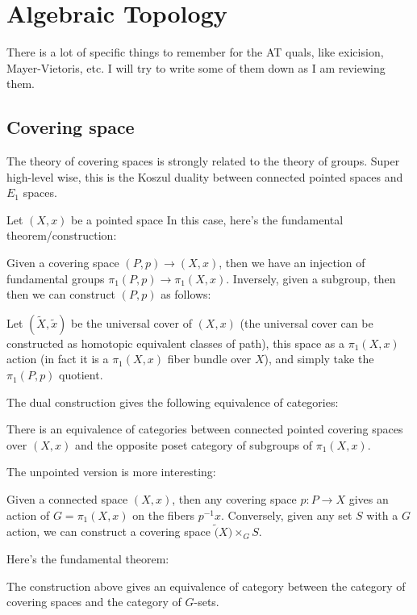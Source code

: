 \documentclass[main.tex]{subfiles}
\begin{document}
\section{Algebraic Topology}
There is a lot of specific things to remember for the AT quals, like exicision, Mayer-Vietoris, etc. I will try to write some of them down as I am reviewing them.

\subsection{Covering space}
The theory of covering spaces is strongly related to the theory of groups. Super high-level wise, this is the Koszul duality between connected pointed spaces and $E_1$ spaces.

Let $(X,x)$ be a pointed space
In this case, here's the fundamental theorem/construction:

\begin{construction}
Given a covering space $(P, p) \rightarrow (X,x)$, then we have an injection of fundamental groups $\pi_1 (P, p) \rightarrow \pi_1 (X,x)$. Inversely, given a subgroup, then then we can construct $(P, p)$ as follows:

Let $(\tilde{X}, \tilde{x})$ be the universal cover of $(X,x)$ (the universal cover can be constructed as homotopic equivalent classes of path), this space as a $\pi_1(X,x)$ action (in fact it is a $\pi_1(X,x)$ fiber bundle over $X$), and simply take the $\pi_1(P, p)$ quotient.
\end{construction}

The dual construction gives the following equivalence of categories:
\begin{theorem}
There is an equivalence of categories between connected pointed covering spaces over $(X, x)$ and the opposite poset category of subgroups of $\pi_1(X,x)$.
\end{theorem}

The unpointed version is more interesting:
\begin{construction}
Given a connected space $(X,x)$, then any covering space $p: P \rightarrow X$ gives an action of $G = \pi_1(X,x)$ on the fibers $p^{-1} x$. Conversely, given any set $S$ with a $G$ action, we can construct a covering space $\tilde(X) \times_G S$. 
\end{construction}

Here's the fundamental theorem:
\begin{theorem}
The construction above gives an equivalence of category between the category of covering spaces and the category of $G$-sets.
\end{theorem}
\end{document}
